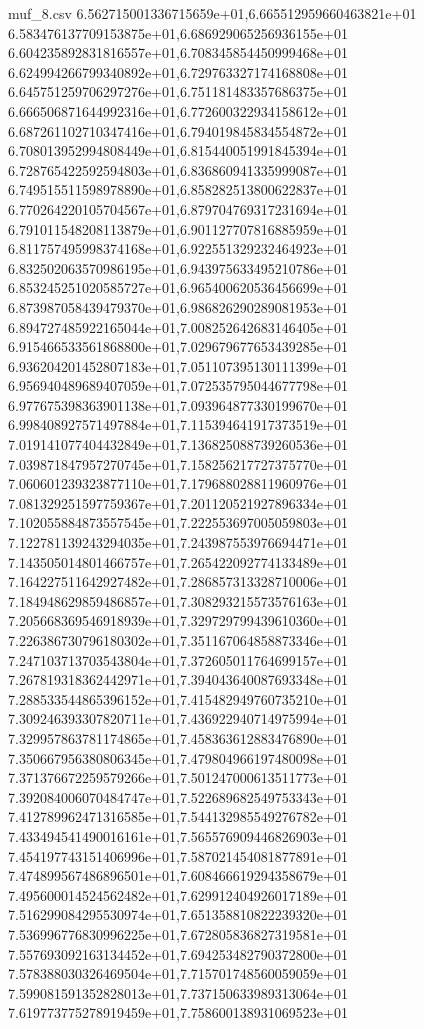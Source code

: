 \begin{filecontents*}{muf_8.csv}
6.562715001336715659e+01,6.665512959660463821e+01
6.583476137709153875e+01,6.686929065256936155e+01
6.604235892831816557e+01,6.708345854450999468e+01
6.624994266799340892e+01,6.729763327174168808e+01
6.645751259706297276e+01,6.751181483357686375e+01
6.666506871644992316e+01,6.772600322934158612e+01
6.687261102710347416e+01,6.794019845834554872e+01
6.708013952994808449e+01,6.815440051991845394e+01
6.728765422592594803e+01,6.836860941335999087e+01
6.749515511598978890e+01,6.858282513800622837e+01
6.770264220105704567e+01,6.879704769317231694e+01
6.791011548208113879e+01,6.901127707816885959e+01
6.811757495998374168e+01,6.922551329232464923e+01
6.832502063570986195e+01,6.943975633495210786e+01
6.853245251020585727e+01,6.965400620536456699e+01
6.873987058439479370e+01,6.986826290289081953e+01
6.894727485922165044e+01,7.008252642683146405e+01
6.915466533561868800e+01,7.029679677653439285e+01
6.936204201452807183e+01,7.051107395130111399e+01
6.956940489689407059e+01,7.072535795044677798e+01
6.977675398363901138e+01,7.093964877330199670e+01
6.998408927571497884e+01,7.115394641917373519e+01
7.019141077404432849e+01,7.136825088739260536e+01
7.039871847957270745e+01,7.158256217727375770e+01
7.060601239323877110e+01,7.179688028811960976e+01
7.081329251597759367e+01,7.201120521927896334e+01
7.102055884873557545e+01,7.222553697005059803e+01
7.122781139243294035e+01,7.243987553976694471e+01
7.143505014801466757e+01,7.265422092774133489e+01
7.164227511642927482e+01,7.286857313328710006e+01
7.184948629859486857e+01,7.308293215573576163e+01
7.205668369546918939e+01,7.329729799439610360e+01
7.226386730796180302e+01,7.351167064858873346e+01
7.247103713703543804e+01,7.372605011764699157e+01
7.267819318362442971e+01,7.394043640087693348e+01
7.288533544865396152e+01,7.415482949760735210e+01
7.309246393307820711e+01,7.436922940714975994e+01
7.329957863781174865e+01,7.458363612883476890e+01
7.350667956380806345e+01,7.479804966197480098e+01
7.371376672259579266e+01,7.501247000613511773e+01
7.392084006070484747e+01,7.522689682549753343e+01
7.412789962471316585e+01,7.544132985549276782e+01
7.433494541490016161e+01,7.565576909446826903e+01
7.454197743151406996e+01,7.587021454081877891e+01
7.474899567486896501e+01,7.608466619294358679e+01
7.495600014524562482e+01,7.629912404926017189e+01
7.516299084295530974e+01,7.651358810822239320e+01
7.536996776830996225e+01,7.672805836827319581e+01
7.557693092163134452e+01,7.694253482790372800e+01
7.578388030326469504e+01,7.715701748560059059e+01
7.599081591352828013e+01,7.737150633989313064e+01
7.619773775278919459e+01,7.758600138931069523e+01

\end{filecontents*}
